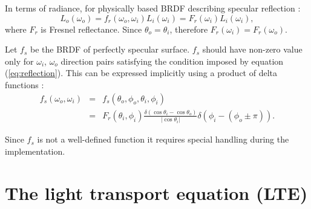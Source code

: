 In terms of radiance, for physically based BRDF describing specular reflection \parencite{phar2010}:
\begin{equation}
  L_{o}(\omega_{o}) = f_{r}(\omega_{o}, \omega_{i}) L_{i}(\omega_{i}) = F_{r}(\omega_{i}) L_{i}(\omega_{i}),
\end{equation}
where $F_{r}$ is Fresnel reflectance. Since $\theta_{o} = \theta_{i}$, therefore $F_{r}(\omega_{i}) = F_{r}(\omega_{o})$.

Let $f_{s}$ be the BRDF of perfectly specular surface. $f_{s}$ should have non-zero value only for $\omega_{i}$, $\omega_{o}$ direction pairs satisfying the condition imposed by equation (\ref{eq:reflection}). This can be expressed implicitly using a product of delta functions \parencite{cohen93}:
\begin{eqnarray}
  f_{s}(\omega_{o}, \omega_{i}) &=& f_{s}(\theta_{o}, \phi_{o}, \theta_{i}, \phi_{i}) \nonumber \\
  &=& F_{r}(\theta_{i}, \phi_{i}) \frac{\delta(\cos\theta_{i} - \cos\theta_{o})}{|\cos\theta_{i}|} \delta(\phi_{i} - (\phi_{o} \pm \pi)).
\end{eqnarray}

Since $f_{s}$ is not a well-defined function it requires special handling during the implementation.


\section{The light transport equation (LTE)}

